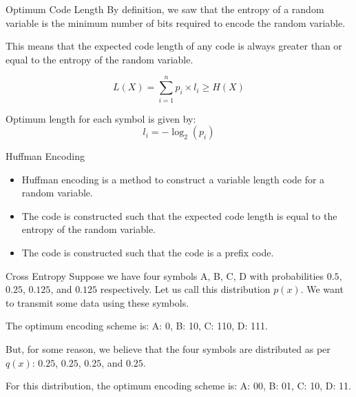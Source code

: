 \documentclass[handout]{beamer}
\begin{document}
    \begin{frame}{Optimum Code Length}
        By definition, we saw that the entropy of a random variable is the minimum number of bits required to encode the random variable.

        This means that the expected code length of any code is always greater than or equal to the entropy of the random variable.
        \begin{tcolorbox}[colback=metropolisblue!5,colframe=metropolisblue,title={Relationship between entropy and expected code length}]
        \begin{equation}
            L(X) = \sum_{i=1}^n p_i \times l_i \geq H(X)
        \end{equation}
        \end{tcolorbox}

        Optimum length for each symbol is given by:
        \begin{equation}
            l_i = -\log_2(p_i)
        \end{equation}
        
    \end{frame}

    \begin{frame}{Huffman Encoding}
        \begin{itemize}
            \item Huffman encoding is a method to construct a variable length code for a random variable.
            \item The code is constructed such that the expected code length is equal to the entropy of the random variable.
            \item The code is constructed such that the code is a prefix code.
        \end{itemize}
        
    \end{frame}

    \begin{frame}{Cross Entropy}
        Suppose we have four symbols A, B, C, D with probabilities $0.5$, $0.25$, $0.125$, and $0.125$ respectively. Let us call this distribution $p(x)$.
        We want to transmit some data using these symbols. 

        The optimum encoding scheme is:
        A: 0, B: 10, C: 110, D: 111.
            
        \pause But, for some reason, we believe that the four symbols are distributed as per $q(x)$: $0.25$, $0.25$, $0.25$, and $0.25$. 
        
        For this distribution, the optimum encoding scheme is:
        A: 00, B: 01, C: 10, D: 11.

    \end{frame}
        
\end{document}
